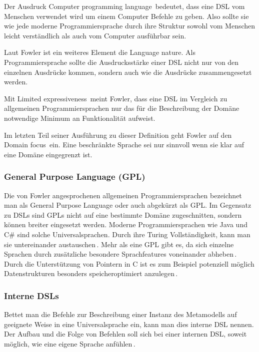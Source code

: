 \documentclass[12pt,oneside,a4paper,parskip]{scrbook}
\begin{document}
Der Ausdruck \glqq Computer programming language\grqq\ bedeutet, dass eine DSL vom Menschen verwendet wird um einem Computer Befehle zu geben. Also sollte sie wie jede moderne Programmiersprache durch ihre Struktur sowohl vom Menschen leicht verständlich als auch vom Computer ausführbar sein.

Laut Fowler ist ein weiteres Element die \glqq Language nature\grqq. Als Programmiersprache sollte die Ausdrucksstärke einer DSL nicht nur von den einzelnen Ausdrücke kommen, sondern auch wie die Ausdrücke zusammengesetzt werden. 

Mit \glqq Limited expressiveness\grqq\ meint Fowler, dass eine DSL im Vergleich zu allgemeinen Programmiersprachen nur das für die Beschreibung der Domäne notwendige Minimum an Funktionalität aufweist. 

Im letzten Teil seiner Ausführung zu dieser Definition geht Fowler auf den \glqq Domain focus\grqq\ ein. Eine beschränkte Sprache sei nur sinnvoll wenn sie klar auf eine Domäne eingegrenzt ist.

\subsubsection{General Purpose Language (GPL)}

Die von Fowler angesprochenen allgemeinen Programmiersprachen bezeichnet man als General Purpose Language oder auch abgekürzt als GPL. Im Gegensatz zu DSLs sind GPLs nicht auf eine bestimmte Domäne zugeschnitten, sondern können breiter eingesetzt werden. Moderne Programmiersprachen wie Java und C\# sind solche Universalsprachen. Durch ihre Turing Vollständigkeit, kann man sie untereinander austauschen\,\cite[S. 111]{hromkovic2014}. Mehr als eine GPL gibt es, da sich einzelne Sprachen durch zusätzliche besondere Sprachfeatures voneinander abheben\,\cite[S. 27]{voelter2013}. Durch die Unterstützung von Pointern in C ist es zum Beispiel potenziell möglich Datenstrukturen besonders speicheroptimiert anzulegen\,\cite[S. 93ff.]{kernighan1988}.

\subsubsection{Interne DSLs}

Bettet man die Befehle zur Beschreibung einer Instanz des Metamodells auf geeignete Weise in eine Universalsprache ein, kann man dies interne DSL nennen. Der Aufbau und die Folge von Befehlen soll sich bei einer internen DSL, soweit möglich, wie eine eigene Sprache anfühlen\,\cite[S 28]{fowler2010}.
\end{document}
